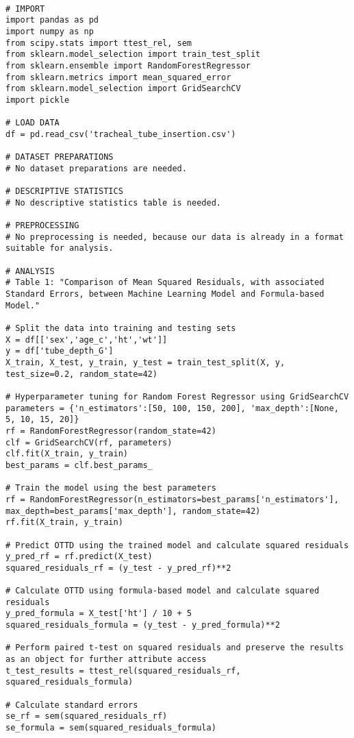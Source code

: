 \documentclass[11pt]{article}
\begin{document}
\begin{verbatim}

# IMPORT
import pandas as pd
import numpy as np
from scipy.stats import ttest_rel, sem
from sklearn.model_selection import train_test_split
from sklearn.ensemble import RandomForestRegressor
from sklearn.metrics import mean_squared_error
from sklearn.model_selection import GridSearchCV
import pickle

# LOAD DATA
df = pd.read_csv('tracheal_tube_insertion.csv')

# DATASET PREPARATIONS
# No dataset preparations are needed.

# DESCRIPTIVE STATISTICS
# No descriptive statistics table is needed.

# PREPROCESSING
# No preprocessing is needed, because our data is already in a format suitable for analysis.

# ANALYSIS
# Table 1: "Comparison of Mean Squared Residuals, with associated Standard Errors, between Machine Learning Model and Formula-based Model."

# Split the data into training and testing sets
X = df[['sex','age_c','ht','wt']]
y = df['tube_depth_G']
X_train, X_test, y_train, y_test = train_test_split(X, y, test_size=0.2, random_state=42)

# Hyperparameter tuning for Random Forest Regressor using GridSearchCV
parameters = {'n_estimators':[50, 100, 150, 200], 'max_depth':[None, 5, 10, 15, 20]}
rf = RandomForestRegressor(random_state=42)
clf = GridSearchCV(rf, parameters)
clf.fit(X_train, y_train)
best_params = clf.best_params_

# Train the model using the best parameters
rf = RandomForestRegressor(n_estimators=best_params['n_estimators'], max_depth=best_params['max_depth'], random_state=42)
rf.fit(X_train, y_train)

# Predict OTTD using the trained model and calculate squared residuals
y_pred_rf = rf.predict(X_test)
squared_residuals_rf = (y_test - y_pred_rf)**2

# Calculate OTTD using formula-based model and calculate squared residuals
y_pred_formula = X_test['ht'] / 10 + 5
squared_residuals_formula = (y_test - y_pred_formula)**2

# Perform paired t-test on squared residuals and preserve the results as an object for further attribute access
t_test_results = ttest_rel(squared_residuals_rf, squared_residuals_formula)

# Calculate standard errors
se_rf = sem(squared_residuals_rf)
se_formula = sem(squared_residuals_formula)


\end{verbatim}
\end{document}
